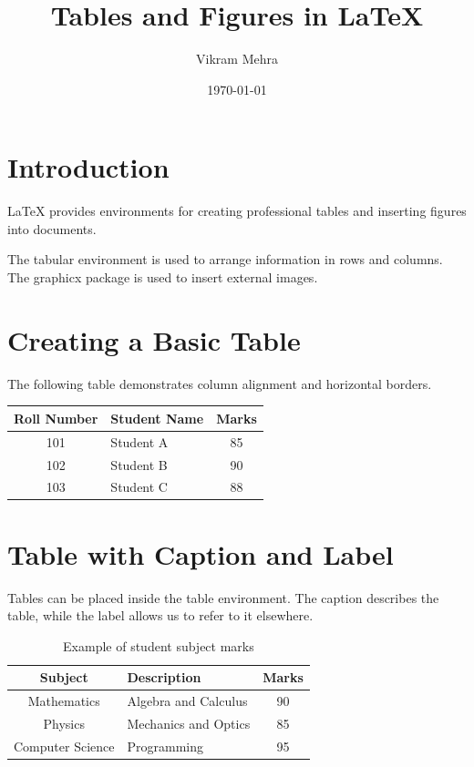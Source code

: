 \documentclass[12pt,a4paper]{article}
\title{Tables and Figures in LaTeX}
\author{Vikram Mehra}
\date{\today}
\begin{document}
\maketitle

\section{Introduction}

LaTeX provides environments for creating professional
tables and inserting figures into documents.

The tabular environment is used to arrange information
in rows and columns. The graphicx package is used to
insert external images.

\section{Creating a Basic Table}

The following table demonstrates column alignment
and horizontal borders.

\begin{center}
\begin{tabular}{|c|l|c|}
\hline
Roll Number & Student Name & Marks \\
\hline
101 & Student A & 85 \\
102 & Student B & 90 \\
103 & Student C & 88 \\
\hline
\end{tabular}
\end{center}

\section{Table with Caption and Label}

Tables can be placed inside the table environment.
The caption describes the table, while the label
allows us to refer to it elsewhere.

\begin{table}[htbp]
\centering
\begin{tabular}{|c|l|c|}
\hline
Subject & Description & Marks \\
\hline
Mathematics & Algebra and Calculus & 90 \\
Physics & Mechanics and Optics & 85 \\
Computer Science & Programming & 95 \\
\hline
\end{tabular}
\caption{Example of student subject marks}
\label{tab:marks}
\end{table}
\end{document}
